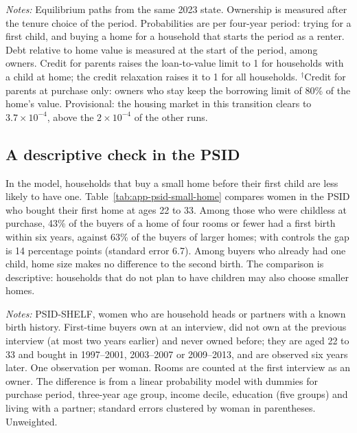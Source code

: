 \begin{table}[H]
\centering
\caption{Credit for parents and the credit relaxation, households in 2023 and 2031}
\label{tab:app-parents}
\small

\par\smallskip
\begin{minipage}{0.92\linewidth}
\footnotesize\textit{Notes:} Equilibrium paths from the same 2023 state.
Ownership is measured after the tenure choice of the period. Probabilities
are per four-year period: trying for a first child, and buying a home for a
household that starts the period as a renter. Debt relative to home value is
measured at the start of the period, among owners. Credit for parents raises
the loan-to-value limit to 1 for households with a child at home; the credit
relaxation raises it to 1 for all households. $^{\dagger}$Credit for parents
at purchase only: owners who stay keep the borrowing limit of 80\% of the
home's value. Provisional: the housing market in this transition clears to
$3.7\times10^{-4}$, above the $2\times10^{-4}$ of the other runs.
\end{minipage}
\end{table}

\subsection{A descriptive check in the PSID}
\label{app:psid-small-home}

In the model, households that buy a small home before their first child are
less likely to have one. Table~\ref{tab:app-psid-small-home} compares women in
the PSID who bought their first home at ages 22 to 33. Among those who were
childless at purchase, 43\% of the buyers of a home of four rooms or fewer had
a first birth within six years, against 63\% of the buyers of larger homes;
with controls the gap is 14 percentage points (standard error 6.7). Among
buyers who already had one child, home size makes no difference to the second
birth. The comparison is descriptive: households that do not plan to have
children may also choose smaller homes.

\begin{table}[H]
\centering
\caption{First-time buyers in the PSID: births within six years by home size at purchase}
\label{tab:app-psid-small-home}
\small

\par\smallskip
\begin{minipage}{0.92\linewidth}
\footnotesize\textit{Notes:} PSID-SHELF, women who are household heads or
partners with a known birth history. First-time buyers own at an interview,
did not own at the previous interview (at most two years earlier) and never
owned before; they are aged 22 to 33 and bought in 1997--2001, 2003--2007 or
2009--2013, and are observed six years later. One observation per woman.
Rooms are counted at the first interview as an owner. The difference is from
a linear probability model with dummies for purchase period, three-year age
group, income decile, education (five groups) and living with a partner;
standard errors clustered by woman in parentheses. Unweighted.
\end{minipage}
\end{table}

